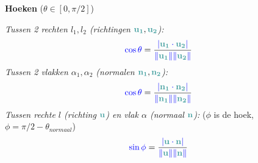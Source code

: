 \documentclass[12pt]{article}
\renewcommand{\vec}[1]{\textcolor{vectorTeal}{\mathbf{#1}}}
\newcommand{\scalar}[1]{\textcolor{scalarBrightBlue}{#1}}
\begin{document}
\vspace{1.5em} %
{\centering
\textcolor{headerBrown}{\large\textbf{Hoeken}} ($\theta \in [0, \pi/2]$)
\par
}%
\textit{Tussen 2 rechten $l_1, l_2$ (richtingen $\vec{u_1}, \vec{u_2}$):}
\[
\scalar{\cos \theta} = \frac{\scalar{|\vec{u_1} \cdot \vec{u_2}|}}{\scalar{\|\vec{u_1}\| \|\vec{u_2}\|}}
\]
\textit{Tussen 2 vlakken $\alpha_1, \alpha_2$ (normalen $\vec{n_1}, \vec{n_2}$):}
\[
\scalar{\cos \theta} = \frac{\scalar{|\vec{n_1} \cdot \vec{n_2}|}}{\scalar{\|\vec{n_1}\| \|\vec{n_2}\|}}
\]
\textit{Tussen rechte $l$ (richting $\vec{u}$) en vlak $\alpha$ (normaal $\vec{n}$):} ($\phi$ is de hoek, $\phi = \pi/2 - \theta_{normaal}$)
\[
\scalar{\sin \phi} = \frac{\scalar{|\vec{u} \cdot \vec{n}|}}{\scalar{\|\vec{u}\| \|\vec{n}\|}}
\]

\end{document}
